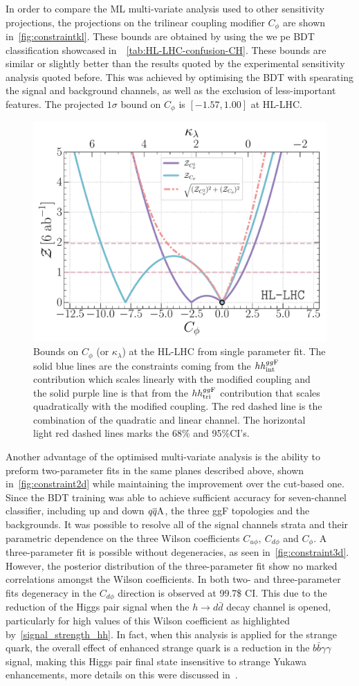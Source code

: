 In order to compare the ML multi-variate analysis used to other sensitivity projections, the projections on the trilinear coupling modifier $C_\phi$ are shown in~\autoref{fig:constraintkl}. These bounds are obtained by using the we pe BDT classification showcased in~~\autoref{tab:HL-LHC-confusion-CH}. These bounds are similar or slightly better than the results quoted by the experimental sensitivity analysis quoted before. This was achieved by optimising the BDT with spearating the signal and background channels, as well as the exclusion of less-important features. The projected $1\sigma$ bound on $C_\phi$ is $[-1.57, 1.00]$ at HL-LHC. 
\begin{figure}[h!]
	\centering
	\includegraphics[width=0.55\linewidth]{fig/HL-LHC-sig14.pdf}
	\caption{ Bounds on $C_\phi$ (or $\kappa_\lambda$) at the HL-LHC from single parameter fit. The solid blue lines are the constraints coming from the $hh^{gg\rm F}_{\rm int}$ contribution which scales linearly with the modified coupling and the solid purple line is that from the $hh^{gg\rm F}_{\rm tri}$ contribution that scales quadratically with the modified coupling. The red dashed line is the combination of the quadratic and linear channel. The horizontal light red dashed lines marks the 68\% and 95\%CI's.}
	\label{fig:constraintkl}
\end{figure}
Another advantage of the optimised multi-variate analysis is the ability to preform two-parameter fits in the same planes described above, shown in~\autoref{fig:constraint2d} while maintaining the improvement over the cut-based one. 
Since the BDT training was able to achieve sufficient accuracy for seven-channel classifier, including up and down $q\overline q \rm A$, the three ggF topologies and the backgrounds. It was possible to resolve all of the signal channels strata and their parametric dependence on the three Wilson coefficients $C_{u\phi},\ C_{d \phi}$ and $C_\phi$. A three-parameter fit is possible without degeneracies, as seen in~\autoref{fig:constraint3d}.  However, the posterior distribution of the three-parameter fit show no marked correlations amongst the Wilson coefficients. In both two- and three-parameter fits degeneracy in the $C_{d\phi}$ direction is observed at 99.7\$ CI. This  due to the reduction of the Higgs pair signal when the $ h \to d \bar d$ decay channel is opened, particularly for high values of this Wilson coefficient as highlighted by~\autoref{signal_strength_hh}. In fact, when this analysis is applied for the strange quark, the overall effect of enhanced strange quark is a reduction in the $ b \bar b \gamma \gamma$ signal, making this Higgs pair final state insensitive to strange Yukawa enhancements, more details on this were discussed in~\cite{Alasfar:2019pmn}. 
